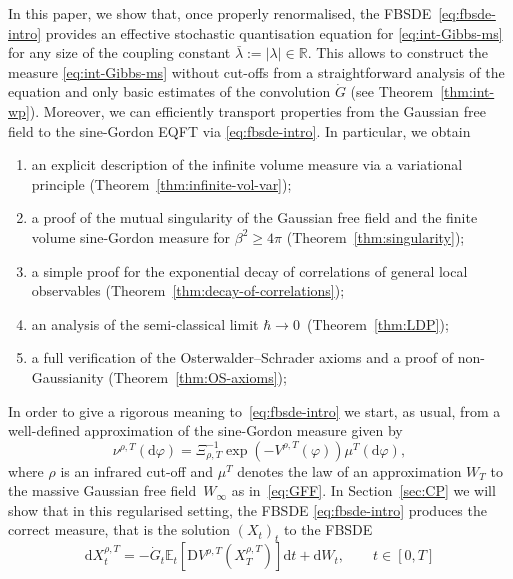 \documentclass[11pt, a4paper]{scrartcl}
\numberwithin{equation}{section}
\theoremstyle{plain}
\theoremstyle{remark}
\newcommand{\mathD}{\mathrm{D}}
\newcommand{\mathd}{\mathrm{d}}
\newenvironment{enumeratealpha}{\begin{enumerate}[a{\textup{)}}] }{\end{enumerate}}
\begin{document}
In this paper, we show that, once properly renormalised, the
FBSDE~\eqref{eq:fbsde-intro} provides an effective stochastic quantisation
equation for \eqref{eq:int-Gibbs-ms} for any size of the coupling constant $\bar{\lambda}:=|\lambda|\in \mathbb{R}$. This allows to construct the measure
\eqref{eq:int-Gibbs-ms} without cut-offs from a straightforward analysis of the
equation and only basic estimates of the convolution $\dot{G}$ (see
Theorem~\ref{thm:int-wp}). Moreover, we can efficiently transport properties
from the Gaussian free field to the sine-Gordon EQFT via
\eqref{eq:fbsde-intro}. In particular, we obtain
\begin{enumeratealpha}
	\item an explicit description of the infinite volume measure via a
	variational principle (Theorem~\ref{thm:infinite-vol-var});

	\item a proof of the mutual singularity of the Gaussian free field and the
	finite volume sine-Gordon measure for $\beta^2 \geqslant 4 \pi$ (Theorem~\ref{thm:singularity});

	\item a simple proof for the exponential decay of correlations of general
	local observables (Theorem~\ref{thm:decay-of-correlations});

	\item an analysis of the semi-classical limit $\hbar \rightarrow
		0$~(Theorem~\ref{thm:LDP});

	\item a full verification of the Osterwalder--Schrader axioms and a proof of
	non-Gaussianity (Theorem~\ref{thm:OS-axioms});
\end{enumeratealpha}
In order to give a rigorous meaning
to~\eqref{eq:fbsde-intro} we start, as usual, from a well-defined
approximation of the sine-Gordon measure given by
\begin{equation}
	\nu^{\rho, T} (\mathd \varphi) = \Xi_{\rho, T}^{- 1} \exp (- V^{\rho, T}
	(\varphi)) \mu^T (\mathd \varphi) \label{eq:int-approx-measures},
\end{equation}
where $\rho$ is an infrared cut-off and $\mu^T$ denotes the law of an
approximation $W_T$ to the massive Gaussian free field~$W_{\infty}$ as
in~\eqref{eq:GFF}. In Section~\ref{sec:CP} we will show that in this
regularised setting, the FBSDE \eqref{eq:fbsde-intro} produces the correct
measure, that is the solution $(X_t)_t$ to the FBSDE
\begin{equation}
	\mathd X^{\rho, T}_t = - \dot{G}_t \mathbb{E}_t [\mathD V^{\rho, T} (X^{\rho, T}_T)] \mathd t +
	\mathd W_t, \qquad t \in [0, T] \label{eq:approx-fbsde}
\end{equation}
\end{document}
